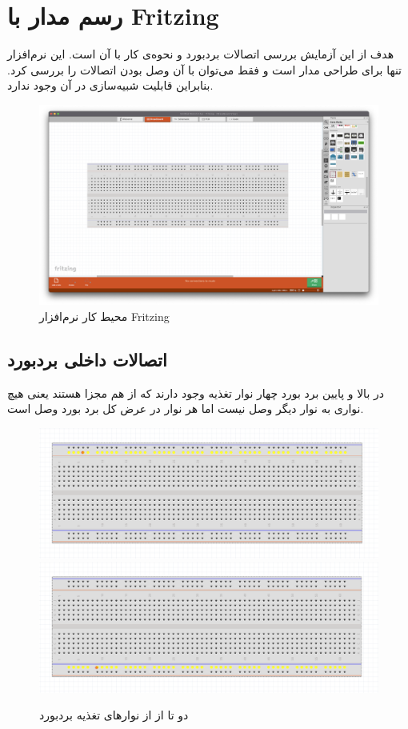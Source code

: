 \chapter{رسم مدار با Fritzing}
هدف از این آزمایش بررسی اتصالات بردبورد و نحوه‌ی کار با آن است.
این نرم‌افزار تنها برای طراحی مدار است
 و فقط می‌توان با آن وصل بودن اتصالات را بررسی کرد.
 بنابراین قابلیت شبیه‌سازی در آن وجود ندارد.

 
\begin{figure}[h!]
\centering
\includegraphics[scale=0.22]{introduction/1.png}    
\caption{محیط کار نرم‌افزار Fritzing}
\end{figure}
 
 
\section{اتصالات داخلی بردبورد}
در بالا و پایین برد بورد چهار نوار تغذیه وجود دارند که از هم مجزا هستند یعنی هیچ نواری
به نوار دیگر وصل نیست اما هر نوار در عرض کل برد بورد وصل است.
\begin{figure}[h!]
\centering
\includegraphics[scale=0.3]{introduction/3.png}    
\includegraphics[scale=0.3]{introduction/4.png}    
\caption{دو تا از از نوارهای تغذیه بردبورد}
\end{figure}

